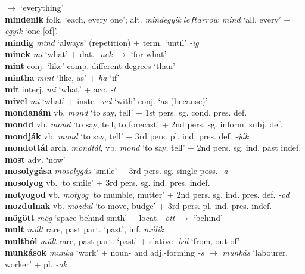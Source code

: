 \documentclass[11pt]{article}
\begin{document}
$\rightarrow$ `everything' \\
\textbf{mindenik} folk. `each, every one'; alt. \emph{mindegyik}
  $leftarrow$ \emph{mind} `all, every' + \emph{egyik} `one [of]'. \\
\textbf{mindig} \emph{mind} `always' (repetition) + term. `until'
  \emph{-ig} \\
\textbf{minek} \emph{mi} `what' + dat. \emph{-nek} $\rightarrow$ `for what' \\
\textbf{mint} conj. `like' \textbar\textbar{} comp. different degrees
`than' \\
\textbf{mintha} \emph{mint} `like, as' + \emph{ha} `if' \\
\textbf{mit} interj. \emph{mi} `what' + acc. \emph{-t} \\
\textbf{mivel} \emph{mi} `what' + instr. \emph{-vel}
`with' \textbar\textbar{} conj. `as (because)' \\
\textbf{mondanám} vb. \emph{mond} `to say, tell' + 1st
pers. sg. cond. pres. def. \\
\textbf{mondd} vb. \emph{mond} `to say,
tell, to forecast' + 2nd pers. sg. inform. subj. def. \\
\textbf{mondják} vb. \emph{mond} `to say, tell' + 3rd
pers. pl. ind. pres. def. \emph{-ják} \\
\textbf{mondottál} arch. \emph{mondtál}, vb. \emph{mond} `to say,
tell' + 2nd pers. sg. ind. past indef. \\
\textbf{most} adv. `now' \\
\textbf{mosolygása} \emph{mosolygás} `smile' + 3rd pers. sg. single
poss. \emph{-a} \\
\textbf{mosolyog} vb. `to smile' + 3rd pers. sg. ind. pres. indef. \\
\textbf{motyogod} vb. \emph{motyog} `to mumble, mutter' + 2nd
pers. sg. ind. pres. def. \emph{-od} \\
\textbf{mozdulnak} vb. \emph{mozdul} `to move, budge' + 3rd
pers. pl. ind. pres. indef. \\
\textbf{mögött} \emph{mög} `space behind smth' +  locat. \emph{-ött}
$\rightarrow$ `behind' \\
\textbf{mult} \emph{múlt} rare, past part. `past',
inf. \emph{múlik} \\
\textbf{multból} \emph{múlt} rare, past part. `past' +
elative \emph{-ból} `from, out of' \\
\textbf{munkások} \emph{munka} `work' + noun\hyp{} and
adj.\hyp{}forming \emph{-s} $\rightarrow$ \emph{munkás} `labourer,
worker' + pl. \emph{-ok} \\
\end{document}
